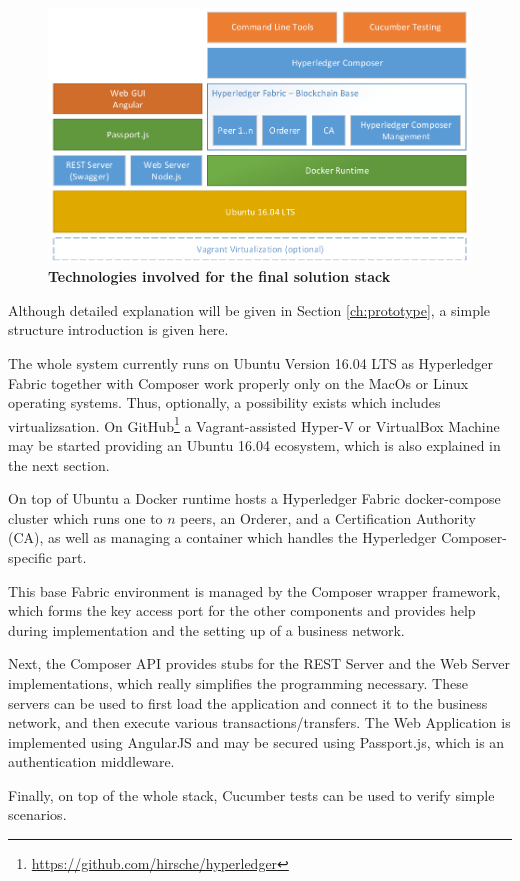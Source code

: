 \begin{figure}[htbp]
  \centering
  \includegraphics[width=1.0\textwidth, clip, trim=1mm 1mm 1mm 1mm]{Figures/solution-stack}
  \caption{\bf\small Technologies involved for the final solution stack}
  \label{fig:solution-stack}
\end{figure}

Although detailed explanation will be given in Section \ref{ch:prototype}, a simple structure introduction is given here.

The whole system currently runs on Ubuntu Version 16.04 LTS as Hyperledger Fabric together with Composer work properly only on the MacOs or Linux operating systems. Thus, optionally, a possibility exists which includes virtualizsation. On GitHub\footnote{\url{https://github.com/hirsche/hyperledger}} a Vagrant-assisted Hyper-V or VirtualBox Machine may be started providing an Ubuntu 16.04 ecosystem, which is also explained in the next section.

On top of Ubuntu a Docker runtime hosts a Hyperledger Fabric docker-compose cluster which runs one to $n$ peers, an Orderer, and a Certification Authority (CA), as well as managing a container which handles the Hyperledger Composer-specific part.

This base Fabric environment is managed by the Composer wrapper framework, which forms the key access port for the other components and provides help during implementation and the setting up of a business network.

Next, the Composer API provides stubs for the REST Server and the Web Server implementations, which really simplifies the programming necessary. These servers can be used to first load the application and connect it to the business network, and then execute various transactions/transfers. The Web Application is implemented using AngularJS and may be secured using Passport.js, which is an authentication middleware.

Finally, on top of the whole stack, Cucumber tests can be used to verify simple scenarios.



